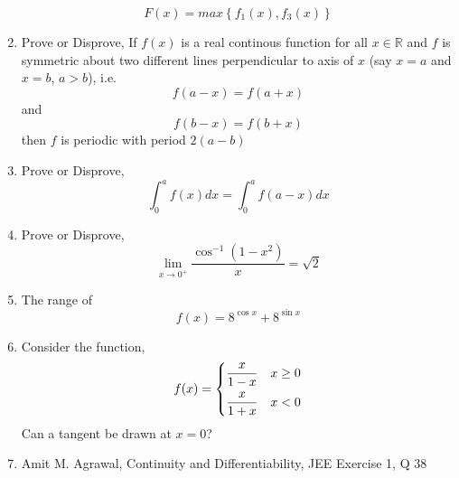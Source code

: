 \documentclass{article}
\begin{document}
\begin{enumerate}
            $$F(x)=max\left\{f_{1}(x),f_{3}(x)\right\}$$
      \item Prove or Disprove,
            If $f(x)$ is a real continous function for all $x \in \mathbb{R}$ and $f$ is symmetric about two different lines perpendicular to axis of $x$ (say $x=a$ and $x=b$, $a>b$), i.e. $$f(a-x)=f(a+x) $$ and $$f(b-x)=f(b+x)$$ then $f$ is periodic with period $2(a-b)$
      \item Prove or Disprove,
            $$\displaystyle\int_{0}^{a} f(x) dx=\displaystyle\int_{0}^{a} f(a-x) dx$$
      \item Prove or Disprove,
            $$\lim\limits_{x \to 0^+}{\dfrac{\cos^{-1} \left(1-x^2\right)}{x}}=\sqrt{2}$$
      \item The range of $$f(x)=8^{\cos x}+8^{\sin x}$$
      \item Consider the function, $$f(x)=\begin{dcases}
                        \dfrac{x}{1-x} & x \ge 0 \\
                        \dfrac{x}{1+x} & x < 0
                  \end{dcases}$$
            Can a tangent be drawn at $x=0$?
      \item Amit M. Agrawal, Continuity and Differentiability, JEE Exercise 1, Q 38
\end{enumerate}
\end{document}

